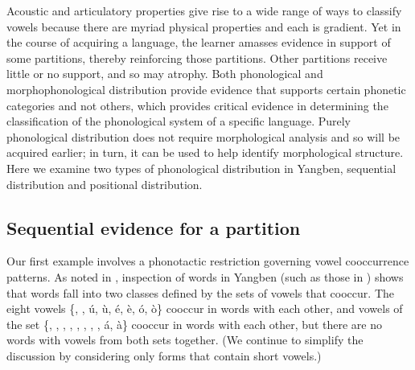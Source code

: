 Acoustic and articulatory properties give rise to a wide range of ways to classify vowels because there are myriad physical properties and each is gradient. Yet in the course of acquiring a language, the learner amasses evidence in support of some partitions, thereby reinforcing those partitions. Other partitions receive little or no support, and so may atrophy. Both phonological and morphophonological distribution provide evidence that supports certain phonetic categories and not others, which provides critical evidence in determining the classification of the phonological system of a specific language. Purely phonological distribution does  not require morphological analysis and so will be acquired earlier; in turn, it can be used to help identify morphological structure. Here we examine two types of phonological distribution in Yangben,  sequential distribution and positional distribution.



\subsection{Sequential evidence for a partition} \label{section_sequential-evidence}

Our first example involves a phonotactic restriction governing vowel cooccurrence patterns.  As noted in \citet[161]{Boyd:2015}, inspection of words in Yangben  (such as those in )  shows that words fall into two classes defined by the sets of vowels that cooccur. The eight vowels
\{\í, \ì,
ú, ù,
é, è,
ó, ò\} cooccur in words with each other, and vowels of the set
\{\Í, \Ì,
\Ú, \Ù,
\É, \È,
\Ó, \Ò,
á, à\}
cooccur in words with each other, but there are no words with vowels from both sets together.  (We continue to simplify the discussion by considering only forms that contain short vowels.)

